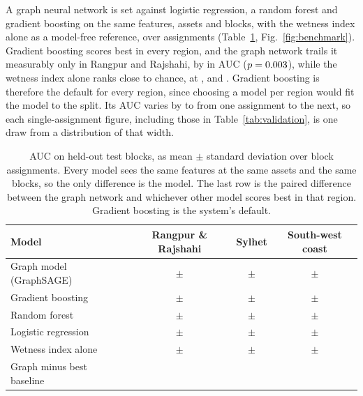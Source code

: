 \documentclass[11pt]{article}
\begin{document}
A graph neural network is set against logistic regression, a random forest and gradient boosting on the same features, assets and blocks, with the wetness index alone as a model-free reference, over \RRBenchSeeds{} assignments (Table~\ref{tab:benchmark}, Fig.~\ref{fig:benchmark}). Gradient boosting scores best in every region, and the graph network trails it measurably only in Rangpur and Rajshahi, by \RRBenchGap{} in AUC ($p=0.003{}$), while the wetness index alone ranks close to chance, at \RRBenchTwiAUC{}, \SylhetBenchTwiAUC{} and \CoastalBenchTwiAUC{}. Gradient boosting is therefore the default for every region, since choosing a model per region would fit the model to the split. Its AUC varies by \SylhetBenchBoostingSD{} to \CoastalBenchBoostingSD{} from one assignment to the next, so each single-assignment figure, including those in Table~\ref{tab:validation}, is one draw from a distribution of that width.

\begin{table}[tp]
\centering
\small
\begin{tabular}{lccc}
\toprule
Model & Rangpur \& Rajshahi & Sylhet & South-west coast \\
\midrule
Graph model (GraphSAGE) & \RRBenchGraphAUC{} $\pm$ \RRBenchGraphSD{} & \SylhetBenchGraphAUC{} $\pm$ \SylhetBenchGraphSD{} & \CoastalBenchGraphAUC{} $\pm$ \CoastalBenchGraphSD{} \\
Gradient boosting & \RRBenchBoostingAUC{} $\pm$ \RRBenchBoostingSD{} & \SylhetBenchBoostingAUC{} $\pm$ \SylhetBenchBoostingSD{} & \CoastalBenchBoostingAUC{} $\pm$ \CoastalBenchBoostingSD{} \\
Random forest & \RRBenchForestAUC{} $\pm$ \RRBenchForestSD{} & \SylhetBenchForestAUC{} $\pm$ \SylhetBenchForestSD{} & \CoastalBenchForestAUC{} $\pm$ \CoastalBenchForestSD{} \\
Logistic regression & \RRBenchLogisticAUC{} $\pm$ \RRBenchLogisticSD{} & \SylhetBenchLogisticAUC{} $\pm$ \SylhetBenchLogisticSD{} & \CoastalBenchLogisticAUC{} $\pm$ \CoastalBenchLogisticSD{} \\
Wetness index alone & \RRBenchTwiAUC{} $\pm$ \RRBenchTwiSD{} & \SylhetBenchTwiAUC{} $\pm$ \SylhetBenchTwiSD{} & \CoastalBenchTwiAUC{} $\pm$ \CoastalBenchTwiSD{} \\
\midrule
Graph minus best baseline & \RRBenchDiff{} & \SylhetBenchDiff{} & \CoastalBenchDiff{} \\
\bottomrule
\end{tabular}
\caption{AUC on held-out test blocks, as mean $\pm$ standard deviation over \RRBenchSeeds{} block assignments. Every model sees the same features at the same assets and the same blocks, so the only difference is the model. The last row is the paired difference between the graph network and whichever other model scores best in that region. Gradient boosting is the system's default.}
\label{tab:benchmark}
\end{table}
\end{document}
